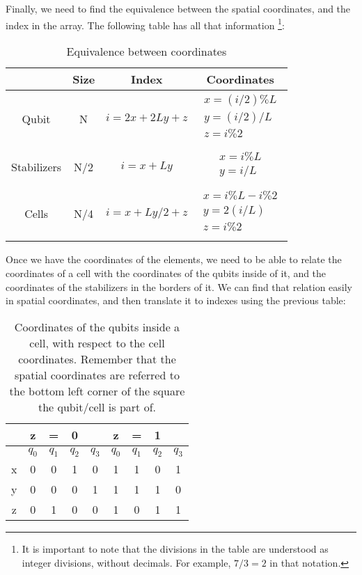 \documentclass[a4paper,12pt]{article}
\begin{document}
Finally, we need to find the equivalence between the spatial coordinates, and the index in the array. The following table has all that information \footnote{It is important to note that the divisions in the table are understood as integer divisions, without decimals. For example, $7/3=2$ in that notation. }:


\begin{table}[h]
\begin{center}
\begin{tabular}{|c|c|c|c|}
\hline
&Size&Index&Coordinates\\
\hline
Qubit		&N 	 &$i=2x+2Ly+z$& $\begin{array}{c}
x=(i/2)\%L\\
y=(i/2)/L\\
z=i\%2\\
\end{array}$\\
\hline
Stabilizers	&N/2 &$i=x+Ly$	& $\begin{array}{c}
x=i\%L\\
y=i/L\\
\end{array}$\\
\hline
Cells		&N/4 &$i=x+Ly/2+z$& $\begin{array}{c}
x=i\%L-i\%2\\
y=2(i/L)\\
z=i\%2\\
\end{array}$\\
\hline
\end{tabular}
\caption{Equivalence between coordinates}
\end{center}
\end{table}


Once we have the coordinates of the elements, we need to be able to relate the coordinates of a cell with the coordinates of the qubits inside of it, and the coordinates of the stabilizers in the borders of it. We can find that relation easily in spatial coordinates, and then translate it to indexes using the previous table:

\begin{table}[h]
\begin{center}
\begin{tabular}{|c|cccc|cccc|}
\hline
&z&=&0&&z&=&1&\\
\hline
&$q_0$&$q_1$&$q_2$&$q_3$&$q_0$&$q_1$&$q_2$&$q_3$\\
\hline
x&0&0&1&0&1&1&0&1\\
y&0&0&0&1&1&1&1&0\\
z&0&1&0&0&1&0&1&1\\
\hline
\end{tabular}
\caption{Coordinates of the qubits inside a cell, with respect to the cell coordinates. Remember that the spatial coordinates are referred to the bottom left corner of the square the qubit/cell is part of.}
\end{center}
\end{table}
\end{document}
